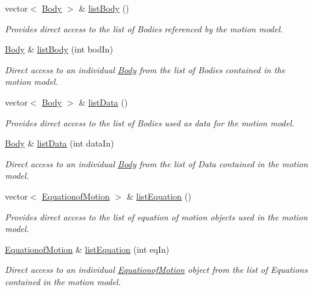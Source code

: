 \begin{DoxyCompactItemize}
vector$<$ \hyperlink{class_body}{Body} $>$ \& \hyperlink{class_motion_model_a67ad0e6b993a20af61170cdebe8f418f}{list\-Body} ()
\begin{DoxyCompactList}\small\item\em Provides direct access to the list of Bodies referenced by the motion model. \end{DoxyCompactList}\item 
\hyperlink{class_body}{Body} \& \hyperlink{class_motion_model_a3c08da3c6cb3e959b53f2cf6f614d3c0}{list\-Body} (int bod\-In)
\begin{DoxyCompactList}\small\item\em Direct access to an individual \hyperlink{class_body}{Body} from the list of Bodies contained in the motion model. \end{DoxyCompactList}\item 
vector$<$ \hyperlink{class_body}{Body} $>$ \& \hyperlink{class_motion_model_ae63712716bcaff9ff263d9728f39323a}{list\-Data} ()
\begin{DoxyCompactList}\small\item\em Provides direct access to the list of Bodies used as data for the motion model. \end{DoxyCompactList}\item 
\hyperlink{class_body}{Body} \& \hyperlink{class_motion_model_a1d7e2b929c15789259aaf732efd7f752}{list\-Data} (int data\-In)
\begin{DoxyCompactList}\small\item\em Direct access to an individual \hyperlink{class_body}{Body} from the list of Data contained in the motion model. \end{DoxyCompactList}\item 
vector$<$ \hyperlink{class_equationof_motion}{Equationof\-Motion} $>$ \& \hyperlink{class_motion_model_a608c356b5eb21fee5036a44124497815}{list\-Equation} ()
\begin{DoxyCompactList}\small\item\em Provides direct access to the list of equation of motion objects used in the motion model. \end{DoxyCompactList}\item 
\hyperlink{class_equationof_motion}{Equationof\-Motion} \& \hyperlink{class_motion_model_a444cd6e6ca1aea0822545b732118aeb9}{list\-Equation} (int eq\-In)
\begin{DoxyCompactList}\small\item\em Direct access to an individual \hyperlink{class_equationof_motion}{Equationof\-Motion} object from the list of Equations contained in the motion model. \end{DoxyCompactList}\end{DoxyCompactItemize}
